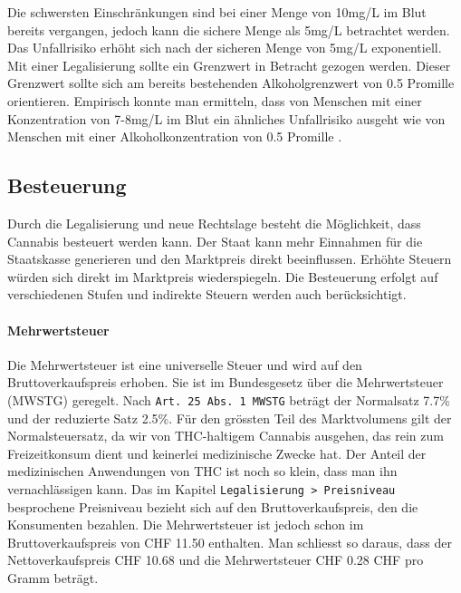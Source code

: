 \documentclass[../main.tex]{subfiles}
\begin{document}
	 \noindent	 
	 Die schwersten Einschränkungen sind bei einer Menge von 10mg/L im Blut bereits vergangen, jedoch kann die sichere Menge als 5mg/L betrachtet werden.
	 Das Unfallrisiko erhöht sich nach der sicheren Menge von 5mg/L exponentiell.
	 Mit einer Legalisierung sollte ein Grenzwert in Betracht gezogen werden.
	 Dieser Grenzwert sollte sich am bereits bestehenden Alkoholgrenzwert von 0.5 Promille orientieren.
	 Empirisch konnte man ermitteln, dass von Menschen mit einer Konzentration von 7-8mg/L im Blut ein ähnliches Unfallrisiko ausgeht wie von Menschen mit einer Alkoholkonzentration von 0.5 Promille \cite{schnabel}.
	 
	 
	 
	 
	
	 
	 
	 
	 
	 
	 \subsection{Besteuerung}
	 Durch die Legalisierung und neue Rechtslage besteht die Möglichkeit, dass Cannabis besteuert werden kann.
	 Der Staat kann mehr Einnahmen für die Staatskasse generieren und den Marktpreis direkt beeinflussen.
	 Erhöhte Steuern würden sich direkt im Marktpreis wiederspiegeln.
	 Die Besteuerung erfolgt auf verschiedenen Stufen und indirekte Steuern werden auch berücksichtigt.
	 
	 \paragraph{Mehrwertsteuer}
	 Die Mehrwertsteuer ist eine universelle Steuer und wird auf den Bruttoverkaufspreis erhoben.
	 Sie ist im Bundesgesetz über die Mehrwertsteuer (MWSTG) geregelt.
	 Nach \texttt{Art. 25 Abs. 1 MWSTG} beträgt der Normalsatz 7.7\% und der reduzierte Satz 2.5\%.
	 Für den grössten Teil des Marktvolumens gilt der Normalsteuersatz, da wir von THC-haltigem Cannabis ausgehen, das rein zum Freizeitkonsum dient und keinerlei medizinische Zwecke hat. 
	 Der Anteil der medizinischen Anwendungen von THC ist noch so klein, dass man ihn vernachlässigen kann.
	 Das im Kapitel \texttt{Legalisierung > Preisniveau} besprochene Preisniveau bezieht sich auf den Bruttoverkaufspreis, den die Konsumenten bezahlen.
	 Die Mehrwertsteuer ist jedoch schon im Bruttoverkaufspreis von CHF 11.50 enthalten.
	 Man schliesst so daraus, dass der Nettoverkaufspreis CHF 10.68 und die Mehrwertsteuer CHF 0.28 CHF pro Gramm beträgt.\\
	 
\end{document}
